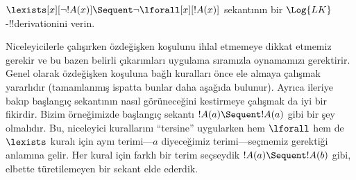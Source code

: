 



\begin{ex}
$\lexists[x][\lnot !A(x)] \Sequent \lnot \lforall[x][!A(x)]$ sekantının
bir $\Log{LK}$-!!{derivation}{}ini verin.

Niceleyicilerle çalışırken özdeğişken koşulunu ihlal etmemeye dikkat etmemiz
gerekir ve bu bazen belirli çıkarımları uygulama sıramızla oynamamızı
gerektirir. Genel olarak özdeğişken koşuluna bağlı kuralları önce ele almaya
çalışmak yararlıdır (tamamlanmış ispatta bunlar daha aşağıda bulunur). Ayrıca
ileriye bakıp başlangıç sekantının nasıl görüneceğini kestirmeye çalışmak da
iyi bir fikirdir. Bizim örneğimizde başlangıç sekantı $!A(a) \Sequent !A(a)$
gibi bir şey olmalıdır. Bu, niceleyici kurallarını ``tersine'' uygularken hem
$\lforall$ hem de $\lexists$ kuralı için aynı terimi---$a$ diyeceğimiz
terimi---seçmemiz gerektiği anlamına gelir. Her kural için farklı bir terim
seçseydik $!A(a) \Sequent !A(b)$ gibi, elbette türetilemeyen bir sekant elde
ederdik.


\end{ex}
